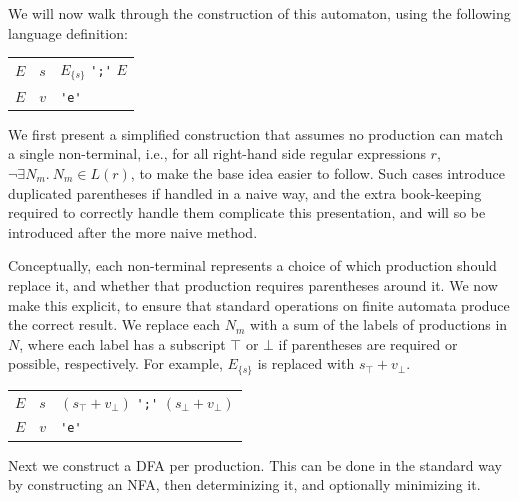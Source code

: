 \documentclass[acmsmall,review,anonymous]{acmart}\settopmatter{printfolios=true,printccs=false,printacmref=false}
\begin{document}
We will now walk through the construction of this automaton, using the following language definition:

\begin{center}
\begin{tabular}{@{}l@{\quad$->$\quad}l@{ $:$\quad}l@{}}
  \toprule
  $E$ & $s$ & $E_{\{s\}}$ \verb|';'| $E$ \\
  $E$ & $v$ & \verb|'e'| \\
  \bottomrule
\end{tabular}
\end{center}

\noindent We first present a simplified construction that assumes no production can match a single non-terminal, i.e., for all right-hand side regular expressions $r$, $\neg \exists N_m.\ N_m \in L(r)$, to make the base idea easier to follow. Such cases introduce duplicated parentheses if handled in a naive way, and the extra book-keeping required to correctly handle them complicate this presentation, and will so be introduced after the more naive method.

Conceptually, each non-terminal represents a choice of which production should replace it, and whether that production requires parentheses around it. We now make this explicit, to ensure that standard operations on finite automata produce the correct result. We replace each $N_m$ with a sum of the labels of productions in $N$, where each label has a subscript $\top$ or $\bot$ if parentheses are required or possible, respectively. For example, $E_{\{s\}}$ is replaced with $s_\top + v_\bot$.

\begin{center}
\begin{tabular}{@{}l@{\quad$->$\quad}l@{ $:$\quad}l@{}}
  \toprule
  $E$ & $s$ & $(s_\top + v_\bot)$ \verb|';'| $(s_\bot + v_\bot)$ \\
  $E$ & $v$ & \verb|'e'| \\
  \bottomrule
\end{tabular}
\end{center}

\noindent Next we construct a DFA per production. This can be done in the standard way by constructing an NFA, then determinizing it, and optionally minimizing it.

\begin{center}
\end{center}
\end{document}
